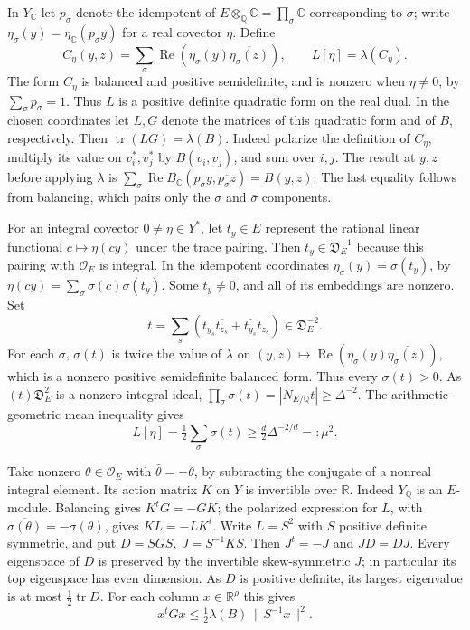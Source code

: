 In \(Y_{\mathbb C}\) let \(p_\sigma\) denote the idempotent of
\(E\otimes_{\mathbb Q}\mathbb C=\prod_\sigma\mathbb C\) corresponding
to \(\sigma\); write \(\eta_\sigma(y)=\eta_{\mathbb C}(p_\sigma y)\)
for a real covector \(\eta\). Define
\[
 C_\eta(y,z)=\sum_\sigma
       \operatorname{Re}(\eta_\sigma(y)\overline{\eta_\sigma(z)}),
       \qquad L[\eta]=\lambda(C_\eta).
\]
The form \(C_\eta\) is balanced and positive semidefinite, and
is nonzero when \(\eta\ne0\), by \(\sum_\sigma p_\sigma=1\).
Thus \(L\) is a positive definite quadratic form on the real dual.
In the chosen coordinates let \(L,G\) denote the matrices of this
quadratic form and of \(B\), respectively. Then
\(\operatorname{tr}(LG)=\lambda(B)\). Indeed polarize the
definition of \(C_\eta\), multiply its value on \(v_i^*,v_j^*\)
by \(B(v_i,v_j)\), and sum over \(i,j\).
The result at \(y,z\) before applying \(\lambda\) is
\(\sum_\sigma \operatorname{Re} B_{\mathbb C}
(p_\sigma y,\overline{p_\sigma z})=B(y,z)\).
The last equality follows from balancing, which pairs only
the \(\sigma\) and \(\bar\sigma\) components.

For an integral covector \(0\ne\eta\in Y^*\), let \(t_y\in E\)
represent the rational linear functional
\(c\mapsto\eta(cy)\) under the trace pairing. Then
\(t_y\in\mathfrak D_E^{-1}\) because this pairing with
\(\mathcal O_E\) is integral. In the idempotent coordinates
\(\eta_\sigma(y)=\sigma(t_y)\), by
\(\eta(cy)=\sum_\sigma \sigma(c)\sigma(t_y)\).
Some \(t_y\ne0\), and all of its embeddings are nonzero.
Set
\[
 t=\sum_s(t_{y_s}\overline{t_{z_s}}+
                     \overline{t_{y_s}}t_{z_s})
            \in\mathfrak D_E^{-2}.
\]
For each \(\sigma\), \(\sigma(t)\) is twice the value of \(\lambda\)
on \((y,z)\mapsto\operatorname{Re}
(\eta_\sigma(y)\overline{\eta_\sigma(z)})\), which is a nonzero
positive semidefinite balanced form. Thus every \(\sigma(t)>0\).
As \((t)\mathfrak D_E^2\) is a nonzero integral ideal,
\(\prod_\sigma \sigma(t)=|N_{E/\mathbb Q}t|\ge\Delta^{-2}\).
The arithmetic--geometric mean inequality gives
\begin{equation}
       L[\eta]=\tfrac12\sum_\sigma\sigma(t)
          \ge \tfrac d2\Delta^{-2/d}=:\mu^2 .
      \label{eq:period-dual-min}
\end{equation}

Take nonzero \(\theta\in\mathcal O_E\) with \(\bar\theta=-\theta\),
by subtracting the conjugate of a nonreal integral element.
Its action matrix \(K\) on \(Y\) is invertible over \(\mathbb R\).
Indeed \(Y_{\mathbb Q}\) is an \(E\)-module. Balancing gives
\(K^tG=-GK\); the polarized expression for \(L\), with
\(\overline{\sigma(\theta)}=-\sigma(\theta)\), gives \(KL=-LK^t\).
Write \(L=S^2\) with \(S\) positive definite symmetric, and put
\(D=SGS,\ J=S^{-1}KS\). Then \(J^t=-J\) and \(JD=DJ\).
Every eigenspace of \(D\) is preserved by the invertible
skew-symmetric \(J\); in particular its top eigenspace has even
dimension. As \(D\) is positive definite, its largest eigenvalue
is at most \(\tfrac12\operatorname{tr}D\).
For each column \(x\in\mathbb R^\rho\) this gives
\[
       x^tGx\le\tfrac12\lambda(B)\,\|S^{-1}x\|^2 .
\]

